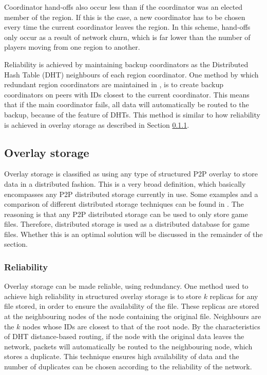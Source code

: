 \documentclass[10pt,a4paper,journal,cspaper,compsoc]{IEEEtran}
\begin{document}
Coordinator hand-offs also occur less than if the coordinator was an elected member of the region. If this is the case, a new coordinator has to be
chosen every time the current coordinator leaves the region. In this scheme, hand-offs only occur as a result of network churn, which is far lower
than the number of players moving from one region to another.

Reliability is achieved by maintaining backup coordinators as the Distributed Hash Table (DHT) neighbours of each region coordinator. One method by
which redundant region coordinators are maintained in \cite{knutsson_p2p_first}, is to create backup coordinators on peers with IDs closest to the
current coordinator. This means that if the main coordinator fails, all data will automatically be routed to the backup, because of the feature of
DHTs. This method is similar to how reliability is achieved in overlay storage as described in Section \ref{overlay_storage_reliability}.

\subsection{Overlay storage}
\label{overlay_storage}

Overlay storage is classified as using any type of structured P2P overlay to store data in a distributed fashion. This is a very broad definition,
which basically encompasses any P2P distributed storage currently in use. Some examples and a comparison of different distributed storage techniques
can be found in \cite{Hasan_distributed_storage_survey}. The reasoning is that any P2P distributed storage can be used to only store game files.
Therefore, distributed storage is used as a distributed database for game files. Whether this is an optimal solution will be discussed in the
remainder of the section.

\subsubsection{Reliability}
\label{overlay_storage_reliability}

Overlay storage can be made reliable, using redundancy. One method used to achieve high reliability in structured overlay storage is to store $k$
replicas for any file stored, in order to ensure the availability of the file. These replicas are stored at the neighbouring nodes of the node
containing the original file. Neighbours are the $k$ nodes whose IDs are closest to that of the root node. By the characteristics of DHT
distance-based routing, if the node with the original data leaves the network, packets will automatically be routed to the neighbouring node, which
stores a duplicate. This technique ensures high availability of data and the number of duplicates can be chosen according to the reliability of the
network.
\end{document}
